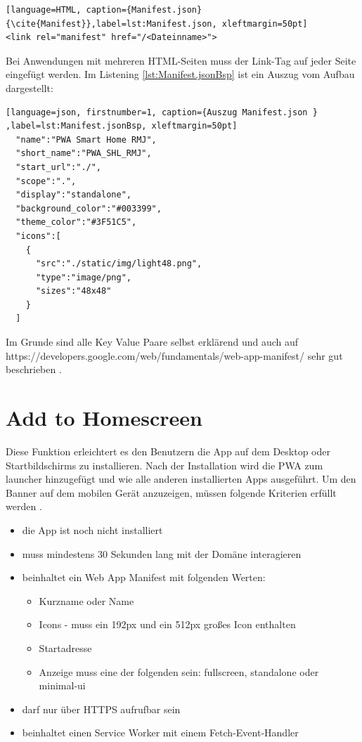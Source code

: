 \begin{lstlisting}[language=HTML, caption={Manifest.json} {\cite{Manifest}},label=lst:Manifest.json, xleftmargin=50pt]
<link rel="manifest" href="/<Dateinname>">
\end{lstlisting}

Bei Anwendungen mit mehreren \acs{HTML}-Seiten muss der Link-Tag auf jeder Seite eingefügt werden. 
Im Listening \ref{lst:Manifest.jsonBsp} ist ein Auszug vom Aufbau dargestellt:
	\begin{lstlisting}[language=json, firstnumber=1, caption={Auszug Manifest.json } ,label=lst:Manifest.jsonBsp, xleftmargin=50pt]
  "name":"PWA Smart Home RMJ",
  "short_name":"PWA_SHL_RMJ",
  "start_url":"./",
  "scope":".",
  "display":"standalone",
  "background_color":"#003399",
  "theme_color":"#3F51C5",
  "icons":[
    {
      "src":"./static/img/light48.png",
      "type":"image/png",
      "sizes":"48x48"
    }
  ]

\end{lstlisting}

Im Grunde sind alle Key Value Paare selbst erklärend und auch auf https://developers.google.com/web/fundamentals/web-app-manifest/ sehr gut beschrieben \cite{Manifest}. 

\section{Add to Homescreen}\label{sub:AddtoHomescreen}
Diese Funktion erleichtert es den Benutzern die App auf dem Desktop oder Startbildschirms zu installieren. Nach der Installation wird die PWA zum launcher hinzugefügt und wie alle anderen installierten Apps ausgeführt.
Um den Banner auf dem mobilen Gerät anzuzeigen, müssen folgende Kriterien erfüllt werden \cite{AddToHomescreen}.


\begin{itemize}
    \item  die App ist noch nicht installiert
	\item  muss mindestens 30 Sekunden lang mit der Domäne interagieren
	\item  beinhaltet ein Web App Manifest mit folgenden Werten:
		 \begin{itemize}
         \item Kurzname oder Name
         \item Icons - muss ein 192px und ein 512px großes Icon enthalten
         \item Startadresse
         \item Anzeige muss eine der folgenden sein: fullscreen, standalone oder \\ minimal-ui
      	\end{itemize}
    \item 	darf nur über HTTPS aufrufbar sein
    \item beinhaltet einen Service Worker mit einem Fetch-Event-Handler  
\end{itemize}


